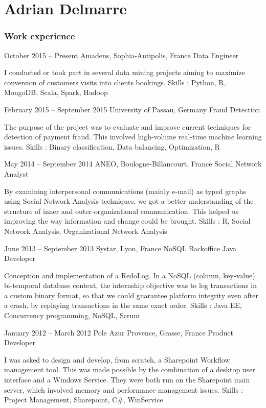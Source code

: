 \documentclass{tccv}
\begin{document}
\part{Adrian Delmarre}

\section{Work experience}

\begin{eventlist}


\item{October 2015 -- Present}
    {Amadeus, Sophia-Antipolis, France}
    {Data Engineer}

I conducted or took part in several data mining projects aiming to maximize conversion of customers visits into clients bookings.
Skills : Python, R, MongoDB, Scala, Spark, Hadoop

\item{February 2015 -- September 2015}
     {University of Passau, Germany}
     {Fraud Detection}

The purpose of the project was to evaluate and improve current techniques for detection of payment fraud. This involved high-volume real-time machine learning issues.
Skills : Binary classification, Data balancing, Optimization, R

\item{May 2014 -- September 2014}
     {ANEO, Boulogne-Billancourt, France}
     {Social Network Analyst}

By examining interpersonal communications (mainly e-mail) as typed graphs using Social Network Analysis techniques, we got a better understanding of the structure of inner and outer-organizational communication. This helped us improving the way information and change could be brought.
Skills : R, Social Network Analysis, Organizational Network Analysis

\item{June 2013 -- September 2013}
     {Systar, Lyon, France}
     {NoSQL Backoffice Java Developer}

Conception and implementation of a RedoLog.
In a NoSQL (column, key-value) bi-temporal database context, the internship objective was to log transactions in a custom binary format, so that we could guarantee platform integrity even after a crash, by replaying transactions in the same exact order.
Skills : Java EE, Concurrency programming, NoSQL, Scrum

\item{January 2012 -- March 2012}
     {Pole Azur Provence, Grasse, France}
     {Product Developer}

I was asked to design and develop, from scratch, a Sharepoint Workflow management tool. This was made possible by the combination of a desktop user interface and a Windows Service. They were both run on the Sharepoint main server, which involved memory and performance management issues.
Skills : Project Management, Sharepoint, C\#, WinService

\end{eventlist}
\end{document}
